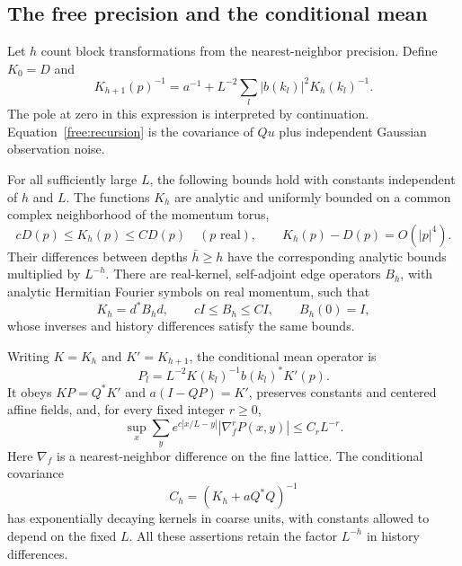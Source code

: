 \subsection{The free precision and the conditional mean}

Let $h$ count block transformations from the nearest-neighbor precision.
Define $K_0=D$ and
\begin{equation}
\label{free:recursion}
 K_{h+1}(p)^{-1}=a^{-1}
       +L^{-2}\sum_l|b(k_l)|^2K_h(k_l)^{-1}.
\end{equation}
The pole at zero in this expression is interpreted by continuation.
Equation~\eqref{free:recursion} is the covariance of $Qu$ plus independent
Gaussian observation noise.

\begin{lemma}
\label{free:bounds}
For all sufficiently large $L$, the following bounds hold with constants
independent of $h$ and $L$. The functions $K_h$ are analytic and uniformly
bounded on a common complex neighborhood of the momentum torus,
\[
 cD(p)\le K_h(p)\le CD(p)\quad(p\text{ real}),\qquad
 K_h(p)-D(p)=O(|p|^4).
\]
Their differences between depths $\bar h\ge h$ have the corresponding
analytic bounds multiplied by $L^{-h}$. There are real-kernel,
self-adjoint edge operators $B_h$, with analytic Hermitian Fourier
symbols on real momentum, such that
\[
 K_h=d^*B_hd,\qquad cI\le B_h\le CI,\qquad B_h(0)=I,
\]
whose inverses and history differences satisfy the same bounds.

Writing $K=K_h$ and $K'=K_{h+1}$, the conditional mean operator is
\begin{equation}
\label{free:P}
 P_l=L^{-2}K(k_l)^{-1}b(k_l)^*K'(p).
\end{equation}
It obeys $KP=Q^*K'$ and $a(I-QP)=K'$, preserves constants and centered
affine fields, and, for every fixed integer $r\ge0$,
\begin{equation}
\label{free:derivative}
 \sup_x\sum_y e^{c|x/L-y|}|\nabla_f^rP(x,y)|\le C_rL^{-r}.
\end{equation}
Here $\nabla_f$ is a nearest-neighbor difference on the fine lattice.
The conditional covariance
\begin{equation}
 C_h=(K_h+aQ^*Q)^{-1}
 \label{free:C}
\end{equation}
has exponentially decaying
kernels in coarse units, with constants allowed to depend on the fixed
$L$. All these assertions retain the factor $L^{-h}$ in history
differences.
\end{lemma}

